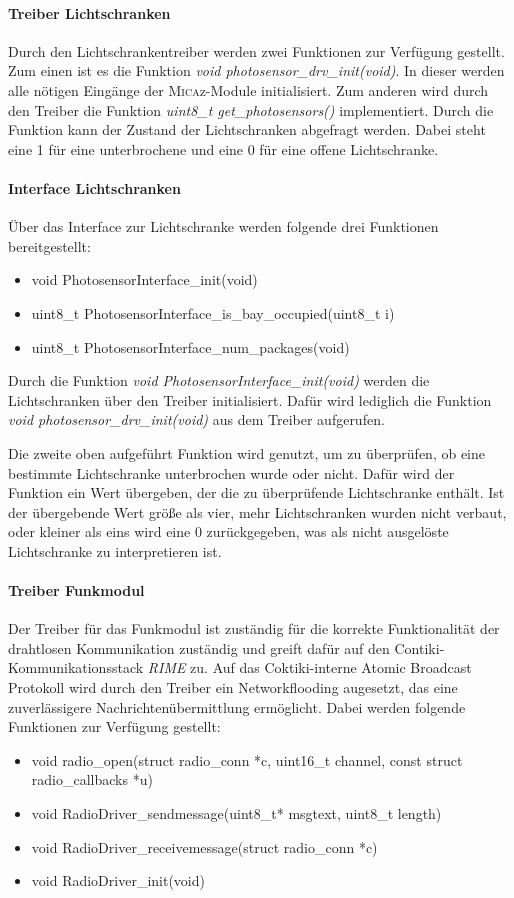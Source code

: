 \paragraph{Treiber Lichtschranken}
Durch den Lichtschrankentreiber werden zwei Funktionen zur Verfügung gestellt. Zum einen ist es die Funktion \textit{void photosensor\_drv\_init(void)}. In dieser werden alle nötigen Eingänge der \textsc{Mica}z-Module initialisiert. Zum anderen wird durch den Treiber die Funktion \textit{uint8\_t get\_photosensors()} implementiert. Durch die Funktion kann der Zustand der Lichtschranken abgefragt werden. Dabei steht eine 1 für eine unterbrochene und eine 0 für eine offene Lichtschranke.

\paragraph{Interface Lichtschranken}
Über das Interface zur Lichtschranke werden folgende drei Funktionen bereitgestellt:
\begin{itemize}
  \item void PhotosensorInterface\_init(void)
  \item uint8\_t PhotosensorInterface\_is\_bay\_occupied(uint8\_t i)
  \item uint8\_t PhotosensorInterface\_num\_packages(void)
\end{itemize}
Durch die Funktion \textit{void PhotosensorInterface\_init(void)} werden die Lichtschranken über den Treiber initialisiert. Dafür wird lediglich die Funktion \textit{void photosensor\_drv\_init(void)} aus dem Treiber aufgerufen.

Die zweite oben aufgeführt Funktion wird genutzt, um zu überprüfen, ob eine bestimmte Lichtschranke unterbrochen wurde oder nicht. Dafür wird der Funktion ein Wert übergeben, der die zu überprüfende Lichtschranke enthält. Ist der übergebende Wert größe als vier, mehr Lichtschranken wurden nicht verbaut, oder kleiner als eins wird eine 0 zurückgegeben, was als nicht ausgelöste Lichtschranke zu interpretieren ist.

\paragraph{Treiber Funkmodul}
Der Treiber für das Funkmodul ist zuständig für die korrekte Funktionalität der drahtlosen Kommunikation zuständig und greift dafür auf den Contiki-Kommunikationsstack \textit{RIME} zu. Auf das Coktiki-interne Atomic Broadcast Protokoll wird durch den Treiber ein Networkflooding augesetzt, das eine zuverlässigere Nachrichtenübermittlung ermöglicht. Dabei werden folgende Funktionen zur Verfügung gestellt:\begin{itemize}
  \item void radio\_open(struct radio\_conn *c, uint16\_t channel, const struct radio\_callbacks *u)
  \item void RadioDriver\_sendmessage(uint8\_t* msgtext, uint8\_t length)
  \item void RadioDriver\_receivemessage(struct radio\_conn *c)
  \item void RadioDriver\_init(void)
\end{itemize}


